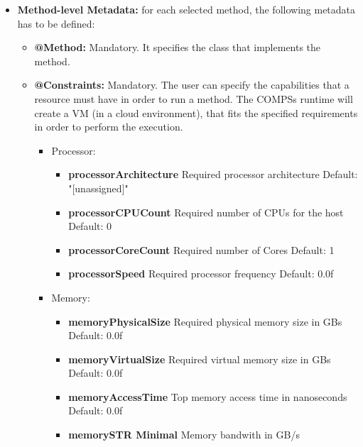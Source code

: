 \begin{itemize}
 \item {\bf Method-level Metadata:} for each selected method, the following metadata has to be defined:
       \begin{itemize}
         \item {\bf @Method:} Mandatory. It specifies the class that implements the method.
         \item {\bf @Constraints:} Mandatory. The user can specify the capabilities that a resource must have in order
               to run a method. The COMPSs runtime will create a VM (in a cloud environment), that fits the
               specified requirements in order to perform the execution.
               \begin{itemize}
                 \item Processor:
                       \begin{itemize}
			  \item \textbf{processorArchitecture} Required processor architecture \newline
                                                               Default: "[unassigned]"
			  \item \textbf{processorCPUCount} Required number of CPUs for the host \newline
							   Default: 0
			  \item \textbf{processorCoreCount} Required number of Cores \newline
							    Default: 1
			  \item \textbf{processorSpeed} Required processor frequency \newline
							Default: 0.0f
                       \end{itemize}
                \item Memory:
                       \begin{itemize}
			  \item \textbf{memoryPhysicalSize} Required physical memory size in GBs \newline
                                                            Default: 0.0f
			  \item \textbf{memoryVirtualSize} Required virtual memory size in GBs \newline
							   Default: 0.0f
			  \item \textbf{memoryAccessTime} Top memory access time in nanoseconds \newline
							  Default: 0.0f
			  \item \textbf{memorySTR Minimal} Memory bandwith in GB/s \newline

\end{itemize}
\end{itemize}
\end{itemize}
\end{itemize}
